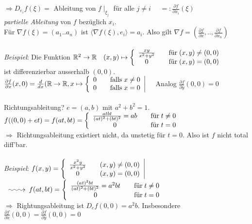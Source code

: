\documentclass[12pt,a4paper,titlepage]{article}
\makeatletter
\newcommand{\longsquiggly}{\xymatrix{{}\ar@{~>}[r]&{}}}
\renewcommand{\d}{\partial}
\newcommand{\setR}{\mathbb{R}}
\makeatother
\begin{document}
$\Rightarrow D_{e_i}f(\xi)=$ Ableitung von $f\mid_{\xi_j}$ für alle $j\neq i$ $\quad =:\frac{\d f}{\d x_i}(\xi)$ \\
\emph{partielle Ableitung} von $f$ bezüglich $x_i$. \\
Für $\nabla f(\xi)=(a_1..a_n)$ ist $\langle\nabla f(\xi),e_i\rangle=a_i$. Also gilt $\nabla f=(\frac{\d f}{\d x},..,\frac{\d f}{\d x_n})$ \\
\\
\textit{Beispiel}: Die Funktion $\setR^2\to\setR\quad (x,y)\mapsto\left\{\begin{array}{c l}
    \frac{xy}{x^2+y^2} & \quad \text{für}\;(x,y)\neq(0,0) \\
    0 & \quad\text{für}\;(x,y)=(0,0) 
  \end{array}\right.$ \\
ist differenzierbar ausserhalb $(0,0)$. \\
$\frac{\d f}{\d x}(x,0)=\frac{d}{dx}(\setR\to\setR,x\mapsto\left\{\begin{array}{c l}
    0 & \quad\text{falls}\; x\neq 0 \\
    0 & \quad\text{falls}\; x=0
  \end{array}\right| \quad$ Analog $\frac{\d f}{\d y}(0,0)=0$ \\
\\
Richtungsableitung? $e=(a,b)$ mit $a^2+b^2=1$. \\
$f((0,0)+et)=f(at,bt)=\left\{\begin{array}{c l}
  \frac{atbt}{(at)^2+(bt)^2}=ab & \quad\text{für}\; t\neq 0 \\
  0 & \quad\text{für}\; t=0
\end{array}\right.$ \\
$\Rightarrow$ Richtungsableitung existiert nicht, da unstetig für $t=0$. Also ist $f$ nicht total diff'bar.\\
\\
\textit{Beispiel}: $f(x,y)=\left\{\begin{array}{c l}
  \frac{x^2y}{x^2+y^2} & \quad (x,y)\neq(0,0) \\
  0 & \quad (x,y)=(0,0)
\end{array}\right|$ 
$\longsquiggly f(at,bt)=\left\{\begin{array}{c l}
    \frac{(at)^2bt}{(at)^2+(bt)^2}=a^2bt & \quad\text{für}\; t\neq 0 \\
    0 & \quad\text{für}\; t=0
  \end{array}\right.$ \\
$\Rightarrow$ Rightungsableitung ist $D_ef(0,0)=a^2b$. Insbesondere $\frac{\d f}{\d x}(0,0)=\frac{\d f}{\d y}(0,0)=0 $ \\
\end{document}
